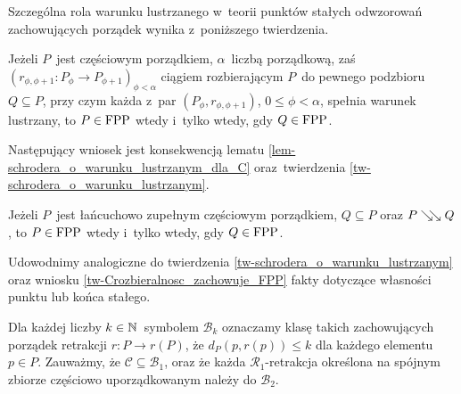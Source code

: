 Szczególna rola warunku lustrzanego w~teorii punktów stałych odwzorowań zachowujących porządek wynika z~poniższego twierdzenia.
\begin{tw}\label{tw-schrodera_o_warunku_lustrzanym}
Jeżeli $P$~jest częściowym porządkiem, $\alpha$~liczbą porządkową, zaś $\left(r_{\phi,\phi+1}\colon P_\phi\to P_{\phi+1}\right)_{\phi<\alpha}$ ciągiem rozbierającym $P$~do pewnego podzbioru $Q\subseteq P$, przy czym każda z~par $\left(P_\phi,r_{\phi,\phi+1}\right)$, $0\leq\phi<\alpha$, spełnia warunek lustrzany, to $P\in\mathrm{FPP}$ wtedy i~tylko wtedy, gdy $Q\in\mathrm{FPP}$.
\end{tw}
Następujący wniosek jest konsekwencją lematu \ref{lem-schrodera_o_warunku_lustrzanym_dla_C} oraz~twierdzenia \ref{tw-schrodera_o_warunku_lustrzanym}.
\begin{wn}\label{tw-Crozbieralnosc_zachowuje_FPP}
Jeżeli $P$~jest łańcuchowo zupełnym częściowym porządkiem, $Q\subseteq P$ oraz \mbox{$P\searrow\!\!\searrow Q$}, to $P\in \mathrm{FPP}$ wtedy i~tylko wtedy, gdy $Q\in\mathrm{FPP}$.
\end{wn}

Udowodnimy analogiczne do twierdzenia \ref{tw-schrodera_o_warunku_lustrzanym} oraz wniosku \ref{tw-Crozbieralnosc_zachowuje_FPP} fakty dotyczące własności punktu lub końca stałego.

Dla każdej liczby $k\in\mathbb{N}$~symbolem $\mathcal{B}_k$ oznaczamy klasę takich zachowujących porządek retrakcji $r\colon P\to r(P)$, że $d_P(p,r(p))\leq k$ dla każdego elementu $p\in P$. Zauważmy, że $\mathcal{C}\subseteq \mathcal{B}_1$, oraz że każda \mbox{$\mathcal{R}_1$-retrakcja} określona na spójnym zbiorze częściowo uporządkowanym należy do $\mathcal{B}_2$.

